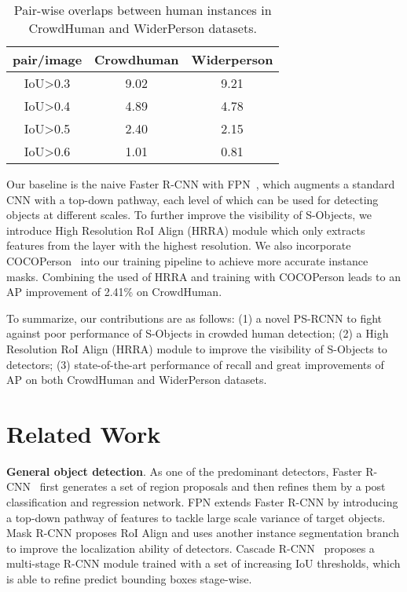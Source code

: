 \documentclass{article}
\begin{document}
\begin{table}[t]
\centering
\begin{tabular}{c|cc}
pair/image& Crowdhuman& Widerperson\\ \hline
IoU\textgreater 0.3 & 9.02& 9.21\\
IoU\textgreater 0.4& 4.89& 4.78\\
IoU\textgreater 0.5& 2.40& 2.15\\
IoU\textgreater 0.6& 1.01& 0.81\\
\end{tabular}
\caption{Pair-wise overlaps between human instances in CrowdHuman and WiderPerson datasets.}
\label{pairwiseoverlaps}
\end{table}

Our baseline is the naive Faster R-CNN with FPN~\cite{Lin2016Feature}, which augments a standard CNN with a top-down pathway, each level of which can be used for detecting objects at different scales. To further improve the visibility of S-Objects, we introduce High Resolution RoI Align (HRRA) module which only extracts features from the layer with the highest resolution. We also incorporate COCOPerson~\cite{lin2014microsoft} into our training pipeline to achieve more accurate instance masks. Combining the used of HRRA and training with COCOPerson leads to an AP improvement of 2.41\% on CrowdHuman.

To summarize, our contributions are as follows: (1) a novel PS-RCNN to fight against poor performance of S-Objects in crowded human detection; (2) a High Resolution RoI Align (HRRA) module to improve the visibility of S-Objects to detectors; (3) state-of-the-art performance of recall and great improvements of AP on both CrowdHuman and WiderPerson datasets.

\section{Related Work}
\vspace{-0.2cm}

\noindent \textbf{General object detection}. As one of the predominant detectors, Faster R-CNN~\cite{Ren2017Faster} first generates a set of region proposals and then refines them by a post classification and regression network. FPN \cite{Dollar2014Fast} extends Faster R-CNN by introducing a top-down pathway of features to tackle large scale variance of target objects. Mask R-CNN \cite{He2017Mask} proposes RoI Align and uses another instance segmentation branch to improve the localization ability of detectors. Cascade R-CNN~\cite{cai2018cascade} proposes a multi-stage R-CNN module trained with a set of increasing IoU thresholds, which is able to refine predict bounding boxes stage-wise.
\end{document}
